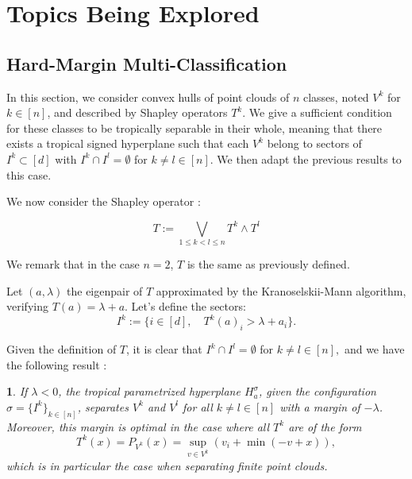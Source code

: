 \documentclass[oneside,english]{amsart}
\numberwithin{equation}{section}
\numberwithin{figure}{section}
\theoremstyle{plain}
\theoremstyle{definition}
\theoremstyle{plain}
\newtheorem{prop}[thm]{\protect\propositionname}
\theoremstyle{remark}
\theoremstyle{plain}
\theoremstyle{definition}
\theoremstyle{definition}
\providecommand{\propositionname}{Proposition}
\begin{document}
\section{Topics Being Explored}

\subsection{Hard-Margin Multi-Classification}

In this section, we consider convex hulls of point clouds of $n$
classes, noted $V^{k}$ for $k\in[n]$, and described by Shapley operators
$T^{k}$. We give a sufficient condition for these classes to be tropically
separable in their whole, meaning that there exists a tropical signed
hyperplane such that each $V^{k}$ belong to sectors of $I^{k}\subset[d]$
with $I^{k}\cap I^{l}=\emptyset$ for $k\ne l\in[n].$ We then adapt
the previous results to this case.

We now consider the Shapley operator :

\[
T:=\bigvee_{1\le k<l\le n}T^{k}\wedge T^{l}
\]

We remark that in the case $n=2$, $T$ is the same as previously
defined.

Let $(a,\lambda)$ the eigenpair of $T$ approximated by the Kranoselskii-Mann
algorithm, verifying $T(a)=\lambda+a$. Let's define the sectors:
\[
I^{k}:=\{i\in[d],\quad T^{k}(a)_{i}>\lambda+a_{i}\}.
\]

Given the definition of $T$, it is clear that $I^{k}\cap I^{l}=\emptyset$
for $k\ne l\in[n],$ and we have the following result :
\begin{prop}
If $\lambda<0$, the tropical parametrized hyperplane $H_{a}^{\sigma}$,
given the configuration $\sigma=\{I^{k}\}_{k\in[n]}$, separates $V^{k}$
and $V^{l}$ for all $k\ne l\in[n]$ with a margin of $-\lambda$.
Moreover, this margin is optimal in the case where all $T^{k}$ are
of the form
\[
T^{k}(x)=P_{V^{k}}(x)=\sup_{v\in V^{k}}\left(v_{i}+\min(-v+x)\right),
\]
 which is in particular the case when separating finite point clouds. 
\end{prop}
\end{document}
